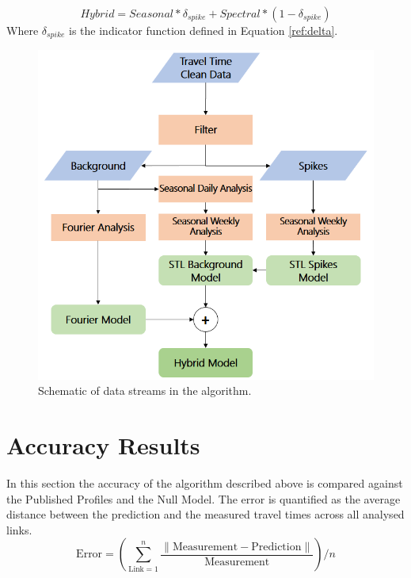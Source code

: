 \documentclass[conference]{IEEEtran}
\begin{document}
\begin{equation}
Hybrid = Seasonal * \delta_{spike} + Spectral * (1 - \delta_{spike})
\end{equation}
Where $\delta_{spike}$ is the indicator function defined in Equation \ref{ref:delta}.
\begin{figure}[htbp]
	\centering
	\includegraphics[width=0.95\linewidth]{new_flow.png}
	\caption{Schematic of data streams in the algorithm.}
	\label{fig:flowchart}
\end{figure}


\section{Accuracy Results}
In this section the accuracy of the algorithm described above is compared against the Published Profiles and the Null Model. 
The error is quantified as the average distance between the prediction and the measured travel times across all analysed links.
\begin{equation}
\textrm{Error} = \left( \sum_{\textrm{Link}=1}^{n} \frac{\|\textrm{Measurement} - \textrm{Prediction}\|}{\textrm{Measurement}}\right) /n 
\end{equation}
\end{document}
